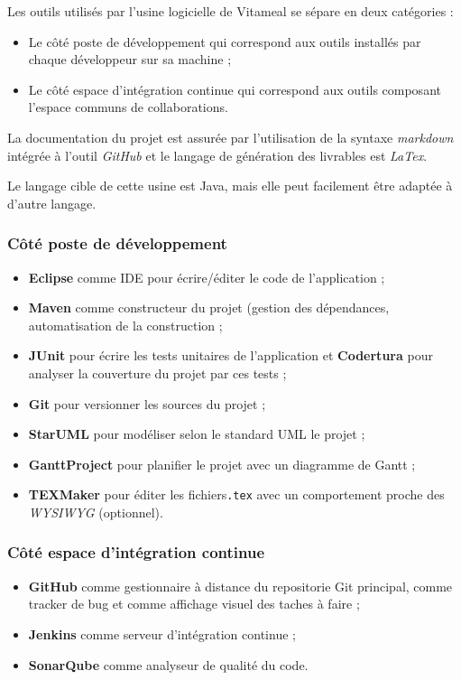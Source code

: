 Les outils utilisés par l'usine logicielle de Vitameal se sépare en deux catégories :

\begin{itemize}
	\item Le côté poste de développement qui correspond aux outils installés par chaque développeur sur sa machine ;
	\item Le côté espace d'intégration continue qui correspond aux outils composant l'espace communs de collaborations.
\end{itemize}

La documentation du projet est assurée par l'utilisation de la syntaxe \emph{markdown} intégrée à l'outil \emph{GitHub} et le langage de génération des livrables est \emph{LaTex}.

Le langage cible de cette usine est Java, mais elle peut facilement être adaptée à d'autre langage.

\subsubsection{Côté poste de développement}

\begin{itemize}
	\item \textbf{Eclipse} comme IDE pour écrire/éditer le code de l'application ;
	\item \textbf{Maven} comme constructeur du projet (gestion des dépendances, automatisation de la construction ;
	\item \textbf{JUnit} pour écrire les tests unitaires de l'application et \textbf{Codertura} pour analyser la couverture du projet par ces tests ;
	\item \textbf{Git} pour versionner les sources du projet ;
	\item \textbf{StarUML} pour modéliser selon le standard UML le projet ;
	\item \textbf{GanttProject} pour planifier le projet avec un diagramme de Gantt ;
	\item \textbf{TEXMaker} pour éditer les fichiers\texttt{.tex} avec un comportement proche des \emph{WYSIWYG} (optionnel).
\end{itemize}

\subsubsection{Côté espace d'intégration continue}

\begin{itemize}
	\item \textbf{GitHub} comme gestionnaire à distance du repositorie Git principal, comme tracker de bug et comme affichage visuel des taches à faire ;
	\item \textbf{Jenkins} comme serveur d'intégration continue ;
	\item \textbf{SonarQube} comme analyseur de qualité du code.
\end{itemize}

